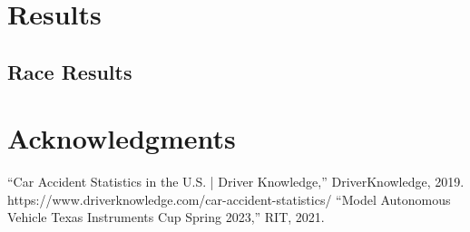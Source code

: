 \documentclass[conference]{IEEEtran}
\begin{document}
\section{Results}

\subsection{Race Results}


\section*{Acknowledgments}

\begin{thebibliography}{00}
 “Car Accident Statistics in the U.S. | Driver Knowledge,” DriverKnowledge, 2019. https://www.driverknowledge.com/car-accident-statistics/
 “Model Autonomous Vehicle Texas Instruments Cup Spring 2023,” RIT, 2021.
\end{thebibliography}
\end{document}

